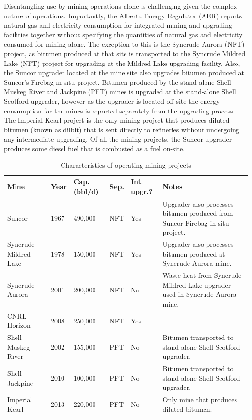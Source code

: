 \documentclass[11pt]{report}
\begin{document}
Disentangling use by mining operations alone is challenging given the complex nature of operations. Importantly, the Alberta Energy Regulator (AER) reports natural gas and electricity consumption for integrated mining and upgrading facilities together without specifying the quantities of natural gas and electricity consumed for mining alone. The exception to this is the Syncrude Aurora (NFT) project, as bitumen produced at that site is transported to the Syncrude Mildred Lake (NFT) project for upgrading at the Mildred Lake upgrading facility.  Also, the Suncor upgrader located at the mine site also upgrades bitumen produced at Suncor's Firebag in situ project.  Bitumen produced by the stand-alone Shell Muskeg River and Jackpine (PFT) mines is upgraded at the stand-alone Shell Scotford upgrader, however as the upgrader is located off-site the energy consumption for the mines is reported separately from the upgrading process. The Imperial Kearl project is the only mining project that produces diluted bitumen (known as dilbit) that is sent directly to refineries without undergoing any intermediate upgrading.  Of all the mining projects, the Suncor upgrader produces some diesel fuel that is combusted as a fuel on-site.

\begin{table}
\caption{Characteristics of operating mining projects}
\label{tab:bitumen_mining_data}
\begin{scriptsize}
\begin{tabularx}{1\columnwidth}{p{}p{}p{}p{}p{}p{}}
\toprule
Mine						& Year & Cap. (bbl/d) & Sep. & Int. upgr.? & Notes \\
\midrule
Suncor					& 1967	& 490,000		& NFT	& Yes	&Upgrader also processes bitumen produced from Suncor Firebag in situ project. \\
Syncrude Mildred Lake		& 1978	& 150,000		& NFT	&Yes		& Upgrader also processes bitumen produced at Syncrude Aurora mine. \\
Syncrude Aurora			& 2001	& 200,000		& NFT	& No		& Waste heat from Syncrude Mildred Lake upgrader used in Syncrude Aurora mine. \\
CNRL Horizon				& 2008	& 250,000		& NFT	& Yes	& \\				
Shell Muskeg River			&2002	& 155,000		& PFT	& No		& Bitumen transported to stand-alone Shell Scotford upgrader. \\
Shell Jackpine				& 2010	& 100,000		& PFT	& No		& Bitumen transported to stand-alone Shell Scotford upgrader. \\
Imperial Kearl				& 2013	& 220,000		& PFT	& No		& Only mine that produces diluted bitumen. \\
\bottomrule
\end{tabularx}
\end{scriptsize}
\end{table}
\end{document}
